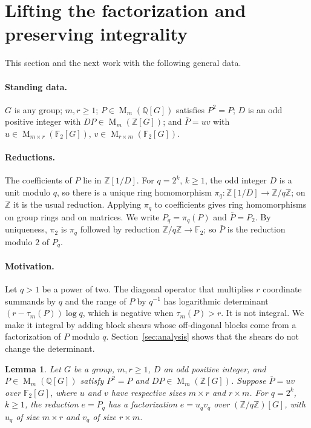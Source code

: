 \documentclass[11pt]{article}
\newtheorem{lemma}[theorem]{Lemma}
\theoremstyle{remark}
\numberwithin{equation}{section}
\newcommand{\F}{\mathbb F}
\newcommand{\Z}{\mathbb Z}
\newcommand{\Q}{\mathbb Q}
\newcommand{\Mat}{\operatorname{M}}
\begin{document}
\section{Lifting the factorization and preserving integrality}
\label{sec:lifting}

This section and the next work with the following general data.

\paragraph{Standing data.}
$G$ is any group; $m,r\ge1$; $P\in\Mat_m(\Q[G])$ satisfies $P^2=P$; $D$ is an odd positive integer with $DP\in\Mat_m(\Z[G])$; and $\bar P=uv$ with $u\in\Mat_{m\times r}(\F_2[G])$, $v\in\Mat_{r\times m}(\F_2[G])$.

\paragraph{Reductions.}
The coefficients of $P$ lie in $\Z[1/D]$. For $q=2^k$, $k\ge1$, the odd integer $D$ is a unit modulo $q$, so there is a unique ring homomorphism $\pi_q:\Z[1/D]\to\Z/q\Z$; on $\Z$ it is the usual reduction. Applying $\pi_q$ to coefficients gives ring homomorphisms on group rings and on matrices. We write $P_q=\pi_q(P)$ and $\bar P=P_2$. By uniqueness, $\pi_2$ is $\pi_q$ followed by reduction $\Z/q\Z\to\F_2$; so $\bar P$ is the reduction modulo $2$ of $P_q$.

\paragraph{Motivation.}
Let $q>1$ be a power of two. The diagonal operator that multiplies $r$ coordinate summands by $q$ and the range of $P$ by $q^{-1}$ has logarithmic determinant $(r-\tau_m(P))\log q$, which is negative when $\tau_m(P)>r$. It is not integral. We make it integral by adding block shears whose off-diagonal blocks come from a factorization of $P$ modulo $q$. Section~\ref{sec:analysis} shows that the shears do not change the determinant.

\begin{lemma}\label{lem:lift}
Let $G$ be a group, $m,r\ge1$, $D$ an odd positive integer, and
$P\in\Mat_m(\Q[G])$ satisfy $P^2=P$ and
$DP\in\Mat_m(\Z[G])$. Suppose $\bar P=uv$ over $\F_2[G]$, where $u$ and $v$
have respective sizes $m\times r$ and $r\times m$. For $q=2^k$,
$k\ge1$, the reduction $e=P_q$ has a factorization
$e=u_qv_q$ over $(\Z/q\Z)[G]$, with $u_q$ of size $m\times r$ and $v_q$ of size $r\times m$.
\end{lemma}
\end{document}
